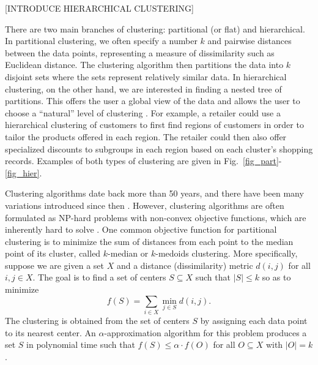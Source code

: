 \documentclass[conference, 10pt, final]{IEEEtran}
\begin{document}
[INTRODUCE HIERARCHICAL CLUSTERING]

There are two main branches of clustering: partitional (or flat) and hierarchical. In partitional clustering, we often specify a number $k$ and pairwise distances between the data points, representing a measure of dissimilarity such as Euclidean distance. The clustering algorithm then partitions the data into $k$ disjoint sets where the sets represent relatively similar data. In hierarchical clustering, on the other hand, we are interested in finding a nested tree of partitions. This offers the user a global view of the data and allows the user to choose a ``natural'' level of clustering \cite{ESL}. For example, a retailer could use a hierarchical clustering of customers to first find regions of customers in order to tailor the products offered in each region. The retailer could then also offer specialized discounts to subgroups in each region based on each cluster's shopping records. Examples of both types of clustering are given in Fig.~\ref{fig_part}-\ref{fig_hier}.

Clustering algorithms date back more than 50 years, and there have been many variations introduced since then \cite{Jain}. However, clustering algorithms are often formulated as NP-hard problems with non-convex objective functions, which are inherently hard to solve \cite{Jain}.
One common objective function for partitional clustering is to minimize the sum of distances from each point to the median point of its cluster, called $k$-median or $k$-medoids clustering. More specifically, suppose we are given a set $X$ and a distance (dissimilarity) metric $d(i,j)$ for all $i,j \in X$. The goal is to find a set of centers $S \subseteq X$ such that $|S| \leq k$ so as to minimize 
\[ f(S) = \sum_{ i\in X} \min_{j \in S} d(i,j). \]
The clustering is obtained from the set of centers $S$ by assigning each data point to its nearest center.  An $\alpha$-approximation algorithm for this problem produces a set $S$ in polynomial time such that $f(S) \leq \alpha \cdot f(O)$ for all $O \subseteq X$ with $|O| = k$. 
\end{document}
